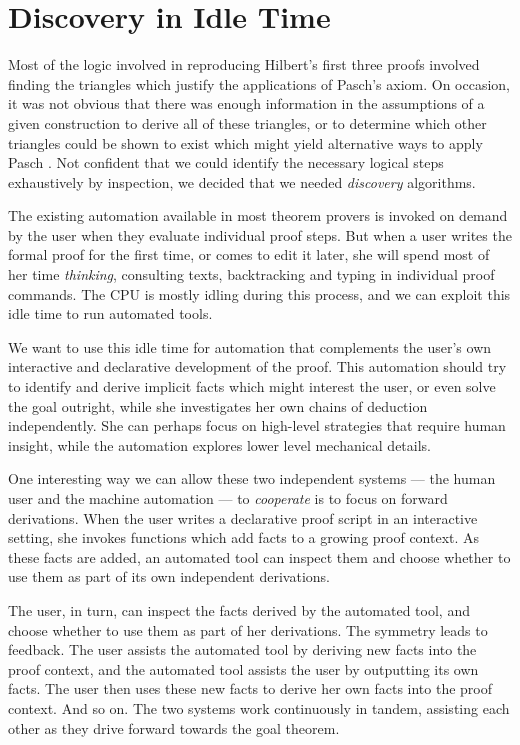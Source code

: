 \section{Discovery in Idle Time}
Most of the logic involved in reproducing Hilbert's first three proofs involved finding the triangles which justify the applications of Pasch's axiom. On occasion, it was not obvious that there was enough information in the assumptions of a given construction to derive all of these triangles, or to determine which other triangles could be shown to exist which might yield alternative ways to apply Pasch . Not confident that we could identify the necessary logical steps exhaustively by inspection, we decided that we needed \emph{discovery} algorithms. 

The existing automation available in most theorem provers is invoked on demand by the user when they evaluate individual proof steps. But when a user writes the formal proof for the first time, or comes to edit it later, she will spend most of her time \emph{thinking}, consulting texts, backtracking and typing in individual proof commands. The CPU is mostly idling during this process, and we can exploit this idle time to run automated tools. 

We want to use this idle time for automation that complements the user's own interactive and declarative development of the proof. This automation should try to identify and derive implicit facts which might interest the user, or even solve the goal outright, while she investigates her own chains of deduction independently. She can perhaps focus on high-level strategies that require human insight, while the automation explores lower level mechanical details.

One interesting way we can allow these two independent systems --- the human user and the machine automation --- to \emph{cooperate} is to focus on forward derivations. When the user writes a declarative proof script in an interactive setting, she invokes functions which add facts to a growing proof context. As these facts are added, an automated tool can inspect them and choose whether to use them as part of its own independent derivations. 

The user, in turn, can inspect the facts derived by the automated tool, and choose whether to use them as part of her derivations. The symmetry leads to feedback. The user assists the automated tool by deriving new facts into the proof context, and the automated tool assists the user by outputting its own facts. The user then uses these new facts to derive her own facts into the proof context. And so on. The two systems work continuously in tandem, assisting each other as they drive forward towards the goal theorem.

